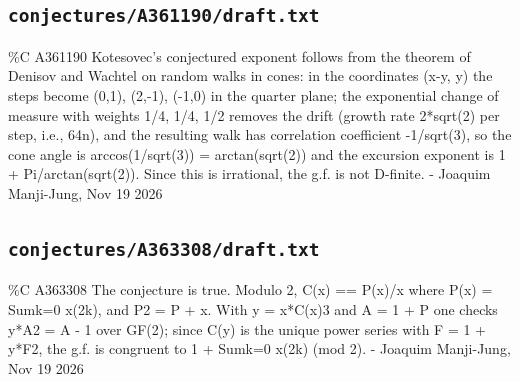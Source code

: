 \subsection*{\texttt{conjectures/A361190/draft.txt}}
{\small\raggedright\ttfamily
\%C A361190 Kotesovec's conjectured exponent follows from the theorem of Denisov and Wachtel on random walks in cones: in the coordinates (x-y, y) the steps become (0,1), (2,-1), (-1,0) in the quarter plane; the exponential change of measure with weights 1/4, 1/4, 1/2 removes the drift (growth rate 2*sqrt(2) per step, i.e., 64n), and the resulting walk has correlation coefficient -1/sqrt(3), so the cone angle is arccos(1/sqrt(3)) = arctan(sqrt(2)) and the excursion exponent is 1 + Pi/arctan(sqrt(2)). Since this is irrational, the g.f. is not D-finite. - Joaquim Manji-Jung, Nov 19 2026\par
}
\subsection*{\texttt{conjectures/A363308/draft.txt}}
{\small\raggedright\ttfamily
\%C A363308 The conjecture is true. Modulo 2, C(x) == P(x)/x where P(x) = Sumk=0 x(2k), and P2 = P + x. With y = x*C(x)3 and A = 1 + P one checks y*A2 = A - 1 over GF(2); since C(y) is the unique power series with F = 1 + y*F2, the g.f. is congruent to 1 + Sumk=0 x(2k) (mod 2). - Joaquim Manji-Jung, Nov 19 2026\par
}
